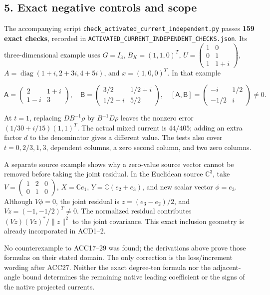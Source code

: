\documentclass[11pt]{article}
\begin{document}
\subsection{5. Exact negative controls and scope}\label{exact-negative-controls-and-scope}

The accompanying script \nolinkurl{check_activated_current_independent.py} passes \textbf{159 exact checks}, recorded in \nolinkurl{ACTIVATED_CURRENT_INDEPENDENT_CHECKS.json}. Its three-dimensional example uses \(G=I_3\), \(B_K=(1,1,0)^T\), \(U=\left(\begin{smallmatrix}1&0\\0&1\\1&1+i\end{smallmatrix}\right)\), \(A=\operatorname{diag}(1+i,2+3i,4+5i)\), and \(x=(1,0,0)^T\). In that example

\[
\mathsf A=\begin{pmatrix}2&1+i\\1-i&3\end{pmatrix},\quad
\mathsf B=\begin{pmatrix}3/2&1/2+i\\1/2-i&5/2\end{pmatrix},\quad
[\mathsf A,\mathsf B]=\begin{pmatrix}-i&1/2\\-1/2&i\end{pmatrix}\ne0.
\]

At \(t=1\), replacing \(DB^{-1}\rho\) by \(B^{-1}D\rho\) leaves the nonzero error \((1/30+i/15)(1,1)^T\). The actual mixed current is \(44/405\); adding an extra factor \(d\) to the denominator gives a different value. The tests also cover \(t=0,2/3,1,3\), dependent columns, a zero second column, and two zero columns.

A separate source example shows why a zero-value source vector cannot be removed before taking the joint residual. In the Euclidean source \(\mathbb C^3\), take \(V=\left(\begin{smallmatrix}1&2&0\\0&1&0\end{smallmatrix}\right)\), \(X=\mathbb C e_1\), \(Y=\mathbb C(e_2+e_3)\), and new scalar vector \(\phi=e_3\). Although \(V\phi=0\), the joint residual is \(z=(e_3-e_2)/2\), and \(Vz=(-1,-1/2)^T\ne0\). The normalized residual contributes \((Vz)(Vz)^*/\|z\|^2\) to the joint covariance. This exact inclusion geometry is already incorporated in ACD1--2.

No counterexample to ACC17--29 was found; the derivations above prove those formulas on their stated domain. The only correction is the loss/increment wording after ACC27. Neither the exact degree-ten formula nor the adjacent-angle bound determines the remaining native leading coefficient or the signs of the native projected currents.
\end{document}
